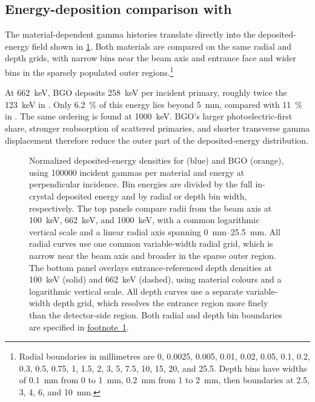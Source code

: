 \subsection{Energy-deposition comparison with }
\label{sec:material-edep-method}

The material-dependent gamma histories translate directly into the deposited-energy field shown in \cref{fig:material-edep}. Both materials are compared on the same radial and depth grids, with narrow bins near the beam axis and entrance face and wider bins in the sparsely populated outer regions.\footnote{\label{fn:material-edep-bins}Radial boundaries in millimetres are 0, 0.0025, 0.005, 0.01, 0.02, 0.05, 0.1, 0.2, 0.3, 0.5, 0.75, 1, 1.5, 2, 3, 5, 7.5, 10, 15, 20, and 25.5. Depth bins have widths of \qty{0.1}{\milli\metre} from 0 to \qty{1}{\milli\metre}, \qty{0.2}{\milli\metre} from 1 to \qty{2}{\milli\metre}, then boundaries at 2.5, 3, 4, 6, and \qty{10}{\milli\metre}.}

At \qty{662}{\kilo\electronvolt}, BGO deposits \qty{258}{\kilo\electronvolt} per incident primary, roughly twice the \qty{123}{\kilo\electronvolt} in . Only \qty{6.2}{\percent} of this energy lies beyond \qty{5}{\milli\metre}, compared with \qty{11}{\percent} in . The same ordering is found at \qty{1000}{\kilo\electronvolt}. BGO's larger photoelectric-first share, stronger reabsorption of scattered primaries, and shorter transverse gamma displacement therefore reduce the outer part of the deposited-energy distribution.

\begin{figure}[!htbp]
  \captionsetup{font=small}
  \centering
  \caption{Normalized deposited-energy densities for  (blue) and BGO (orange), using \num{100000} incident gammas per material and energy at perpendicular incidence. Bin energies are divided by the full in-crystal deposited energy and by radial or depth bin width, respectively. The top panels compare radii from the beam axis at \qty{100}{\kilo\electronvolt}, \qty{662}{\kilo\electronvolt}, and \qty{1000}{\kilo\electronvolt}, with a common logarithmic vertical scale and a linear radial axis spanning \qtyrange{0}{25.5}{\milli\metre}. All radial curves use one common variable-width radial grid, which is narrow near the beam axis and broader in the sparse outer region. The bottom panel overlays entrance-referenced depth densities at \qty{100}{\kilo\electronvolt} (solid) and \qty{662}{\kilo\electronvolt} (dashed), using material colours and a logarithmic vertical scale. All depth curves use a separate variable-width depth grid, which resolves the entrance region more finely than the detector-side region. Both radial and depth bin boundaries are specified in \hyperref[fn:material-edep-bins]{footnote~\ref*{fn:material-edep-bins}}.}
  \label{fig:material-edep}
\end{figure}

